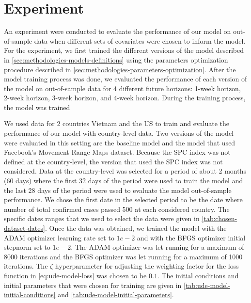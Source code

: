 \section{Experiment}

An experiment were conducted to evaluate the performance of our model on out-of-sample data when different sets of covariates were chosen to inform the model.
For the experiment, we first trained the different versions of the model described in \autoref{sec:methodologies-models-definitions} using the parameters optimization procedure described in \autoref{sec:methodologies-parameters-optimization}.
After the model training process was done, we evaluated the performance of each version of the model on out-of-sample data for 4 different future horizons: 1-week horizon, 2-week horizon, 3-week horizon, and 4-week horizon.
During the training process, the model was trained

We used data for 2 countries Vietnam and the \gls{US} to train and evaluate the performance of our model with country-level data.
Two versions of the model were evaluated in this setting are the baseline model and the model that used Facebook's Movement Range Maps dataset.
Because the \gls{SPC} index was not defined at the country-level, the version that used the \gls{SPC} index was not considered.
Data at the country-level was selected for a period of about 2 months (60 days) where the first 32 days of the period were used to train the model and the last 28 days of the period were used to evaluate the model out-of-sample performance.
We chose the first date in the selected period to be the date where number of total confirmed cases passed 500 at each considered country.
The specific dates ranges that we used to select the data were given in \autoref{tab:chosen-dataset-dates}.
Once the data was obtained, we trained the model with the ADAM optimizer learning rate set to $1e-2$ and with the BFGS optimizer initial stepnorm set to $1e-2$.
The ADAM optimizer was let running for a maximum of 8000 iterations and the BFGS optimizer was let running for a maximum of 1000 iterations.
The $\zeta$ hyperparameter for adjusting the weighting factor for the loss function in \autoref{eq:ude-model-loss} was chosen to be $0.1$.
The initial conditions and initial parameters that were chosen for training are given in \autoref{tab:ude-model-initial-conditions} and \autoref{tab:ude-model-initial-parameters}.

